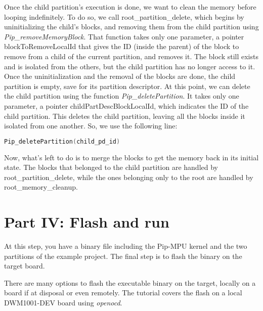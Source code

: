\documentclass[10pt,a4paper,titlepage]{refart}
\begin{document}
Once the child partition's execution is done, we want to clean the memory before looping indefinitely. To do so, we call 
root\_partition\_delete, which begins by uninitializing the child's blocks, and removing them from the child partition using 
\textit{Pip\_removeMemoryBlock}. That function takes only one parameter, a pointer blockToRemoveLocalId that gives the ID (inside 
the parent) of the block to remove from a child of the current partition, and removes it. The block still exists and is isolated 
from the others, but the child partition has no longer access to it. Once the uninitialization and the removal of the blocks are 
done, the child partition is empty, save for its partition descriptor. At this point, we can delete the child partition using the 
function \textit{Pip\_deletePartition}. It takes only one parameter, a pointer childPartDescBlockLocalId, which indicates the ID 
of the child partition. This deletes the child partition, leaving all the blocks inside it isolated from one another. So, we use 
the following line:
\begin{lstlisting}[language=C]
Pip_deletePartition(child_pd_id)
\end{lstlisting}

Now, what's left to do is to merge the blocks to get the memory back in its initial state. The blocks that belonged to the child 
partition are handled by root\_partition\_delete, while the ones belonging only to the root are handled by root\_memory\_cleanup.




\section{Part IV: Flash and run} \label{fourth}
At this step, you have a binary file including the Pip-MPU kernel and the two partitions of the example project.
The final step is to flash the binary on the target board.

There are many options to flash the executable binary on the target, locally on a board if at disposal or even remotely.
The tutorial covers the flash on a local DWM1001-DEV board using \textit{openocd}.
\end{document}
